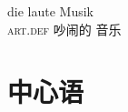 \ea
\gll die laute Musik\\
     \textsc{art}.\textsc{def} 吵闹的 音乐\\
\z 

\section{中心语}
\label{Abschnitt-Kopf}

